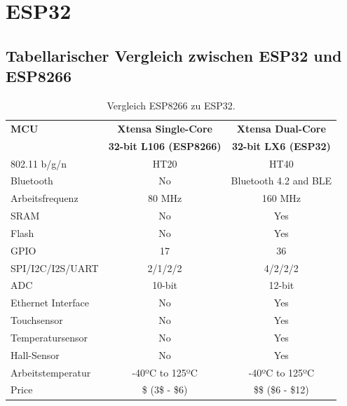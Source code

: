 \section{ESP32}\label{Appendix:ESP_32}

\subsection{Tabellarischer Vergleich zwischen ESP32 und ESP8266}\label{Appendix:ESP32_vs_ESP8266}

\begin{table}[H]
\center
\begin{tabular}{|l|c|c|}
\hline
\textbf{MCU}                    & \textbf{Xtensa Single-Core} & \textbf{Xtensa Dual-Core} \\

			                   & \textbf{32-bit L106 (ESP8266)} & \textbf{32-bit LX6 (ESP32)} \\ \hline

802.11 b/g/n     		& HT20                           & HT40                                       \\
Bluetooth              	& No                             & Bluetooth 4.2 and BLE                      \\
Arbeitsfrequenz			& 80 MHz                         & 160 MHz                                    \\
SRAM                   	& No                             & Yes                                         \\
Flash                  	& No                             & Yes                                          \\
GPIO                   	& 17                             & 36                                         \\
SPI/I2C/I2S/UART       	& 2/1/2/2                        & 4/2/2/2                                    \\
ADC                    	& 10-bit                         & 12-bit                                     \\
Ethernet Interface 		& No                             & Yes                                          \\
Touchsensor           	& No                             & Yes                                          \\
Temperatursensor     	& No                             & Yes                                          \\
Hall-Sensor     			& No                             & Yes \\
Arbeitstemperatur    	& -40ºC to 125ºC                 & -40ºC to 125ºC                             \\
Price                  	& \$ (3\$ - \$6)                 & \$\$ (\$6 - \$12)    \\                         
\hline
\end{tabular}
\caption{Vergleich ESP8266 zu ESP32. \cite{iainandrew_esp8266_2018}}
\label{tab:ESP}
\end{table}

